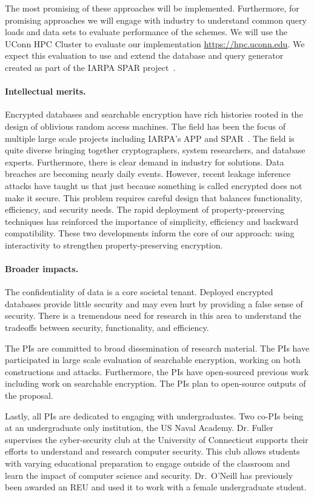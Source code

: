 The most promising of these approaches will be implemented.  Furthermore, for promising approaches we will engage with industry to understand common query loads and data sets to evaluate performance of the schemes.  We will use the UConn HPC Cluster to evaluate our implementation \url{https://hpc.uconn.edu}.  We expect this evaluation to use and extend the database and query generator created as part of the IARPA SPAR project~\cite{varia2015automated}.

\paragraph{Intellectual merits.}  
Encrypted databases and searchable encryption have rich histories rooted in the
design of oblivious random access machines.  The field has been the focus of multiple large scale projects including IARPA's APP and SPAR~\cite{spar_baa}.  The field is quite diverse bringing together cryptographers, system researchers, and database experts.  Furthermore, there is clear demand in industry for solutions.  Data breaches are becoming nearly daily events.  However, recent
leakage inference attacks have taught us that just because something is called encrypted does not make it secure.  This problem requires careful design that balances functionality, efficiency, and security needs.  The rapid deployment of property-preserving
techniques has reinforced the importance of simplicity, efficiency and backward
compatibility.  These two developments inform the core of our approach: using
interactivity to strengthen property-preserving encryption.

\paragraph{Broader impacts.}
The confidentiality of data is a core societal tenant.  Deployed encrypted
databases provide little security and may even hurt by providing a false sense
of security.  There is a tremendous need for research in this area to
understand the tradeoffs between security, functionality, and efficiency.

The PIs are committed to broad dissemination of research material.  The PIs
have participated in large scale evaluation of searchable encryption, working
on both constructions and attacks.  Furthermore, the PIs have open-sourced
previous work including work on searchable encryption.  The PIs plan to open-source outputs of the proposal.  

Lastly, all PIs are
dedicated to engaging with undergraduates. Two co-PIs being at an
undergraduate only institution, the US Naval Academy.  Dr. Fuller supervises the cyber-security club at the University of Connecticut supports their efforts to understand and research computer security.  This club allows students with varying educational preparation to engage outside of the classroom and learn the impact of computer science and security.  Dr.~O'Neill has previously been awarded an REU and used it to  work with a female undergraduate student.



